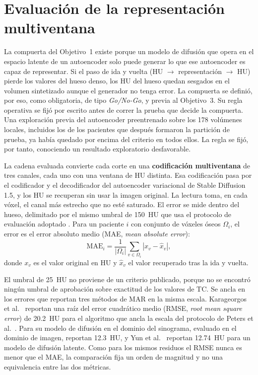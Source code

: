 \section{Evaluación de la representación multiventana}\label{sec:obj1}

La compuerta del Objetivo~1 existe porque un modelo de difusión que opera en el espacio latente de un autoencoder solo puede generar lo que ese autoencoder es capaz de representar. Si el paso de ida y vuelta (HU $\rightarrow$ representación $\rightarrow$ HU) pierde los valores del hueso denso, los HU del hueso quedan sesgados en el volumen sintetizado aunque el generador no tenga error. La compuerta se definió, por eso, como obligatoria, de tipo \emph{Go/No-Go}, y previa al Objetivo~3. Su regla operativa se fijó por escrito antes de correr la prueba que decide la compuerta. Una exploración previa del autoencoder preentrenado sobre los 178 volúmenes locales, incluidos los de los pacientes que después formaron la partición de prueba, ya había quedado por encima del criterio en todos ellos. La regla se fijó, por tanto, conociendo un resultado exploratorio desfavorable.

La cadena evaluada convierte cada corte en una \textbf{codificación multiventana} de tres canales, cada uno con una ventana de HU distinta. Esa codificación pasa por el codificador y el decodificador del autoencoder variacional de Stable Diffusion 1.5, y los HU se recuperan sin usar la imagen original. La lectura toma, en cada vóxel, el canal más estrecho que no esté saturado. El error se mide dentro del hueso, delimitado por el mismo umbral de 150~HU que usa el protocolo de evaluación adoptado \cite{peters2025hybrid,haneda2025aapm}. Para un paciente $i$ con conjunto de vóxeles óseos $\Omega_i$, el error es el error absoluto medio (MAE, \emph{mean absolute error}):
\begin{equation}
\mathrm{MAE}_i = \frac{1}{|\Omega_i|} \sum_{v \in \Omega_i} \left| x_v - \hat{x}_v \right|,
\label{eq:mae}
\end{equation}
donde $x_v$ es el valor original en HU y $\hat{x}_v$ el valor recuperado tras la ida y vuelta.

El umbral de 25~HU no proviene de un criterio publicado, porque no se encontró ningún umbral de aprobación sobre exactitud de los valores de TC. Se ancla en los errores que reportan tres métodos de MAR en la misma escala. Karageorgos et al.~\cite{karageorgos2024ddpm} reportan una raíz del error cuadrático medio (RMSE, \emph{root mean square error}) de 20.2~HU para el algoritmo que ancla la escala del protocolo de Peters et al.~\cite{peters2025hybrid}. Para su modelo de difusión en el dominio del sinograma, evaluado en el dominio de imagen, reportan 12.3~HU, y Yun et al.~\cite{yun2026simulationdriven} reportan 12.74~HU para un modelo de difusión latente. Como para los mismos residuos el RMSE nunca es menor que el MAE, la comparación fija un orden de magnitud y no una equivalencia entre las dos métricas.

